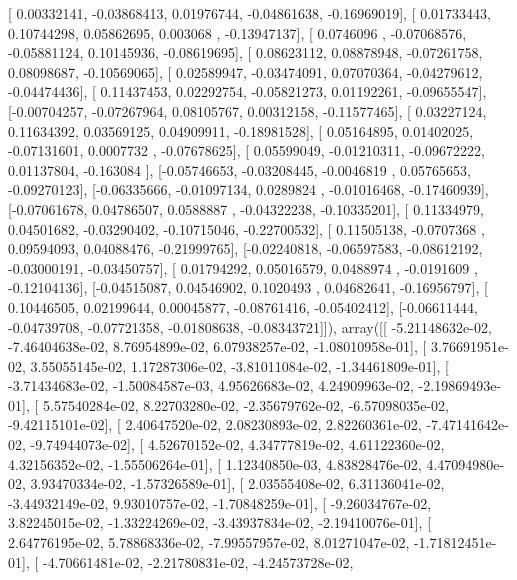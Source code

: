 \documentclass{article}
\begin{document}
       [ 0.00332141, -0.03868413,  0.01976744, -0.04861638, -0.16969019],
       [ 0.01733443,  0.10744298,  0.05862695,  0.003068  , -0.13947137],
       [ 0.0746096 , -0.07068576, -0.05881124,  0.10145936, -0.08619695],
       [ 0.08623112,  0.08878948, -0.07261758,  0.08098687, -0.10569065],
       [ 0.02589947, -0.03474091,  0.07070364, -0.04279612, -0.04474436],
       [ 0.11437453,  0.02292754, -0.05821273,  0.01192261, -0.09655547],
       [-0.00704257, -0.07267964,  0.08105767,  0.00312158, -0.11577465],
       [ 0.03227124,  0.11634392,  0.03569125,  0.04909911, -0.18981528],
       [ 0.05164895,  0.01402025, -0.07131601,  0.0007732 , -0.07678625],
       [ 0.05599049, -0.01210311, -0.09672222,  0.01137804, -0.163084  ],
       [-0.05746653, -0.03208445, -0.0046819 ,  0.05765653, -0.09270123],
       [-0.06335666, -0.01097134,  0.0289824 , -0.01016468, -0.17460939],
       [-0.07061678,  0.04786507,  0.0588887 , -0.04322238, -0.10335201],
       [ 0.11334979,  0.04501682, -0.03290402, -0.10715046, -0.22700532],
       [ 0.11505138, -0.0707368 ,  0.09594093,  0.04088476, -0.21999765],
       [-0.02240818, -0.06597583, -0.08612192, -0.03000191, -0.03450757],
       [ 0.01794292,  0.05016579,  0.0488974 , -0.0191609 , -0.12104136],
       [-0.04515087,  0.04546902,  0.1020493 ,  0.04682641, -0.16956797],
       [ 0.10446505,  0.02199644,  0.00045877, -0.08761416, -0.05402412],
       [-0.06611444, -0.04739708, -0.07721358, -0.01808638, -0.08343721]]), array([[ -5.21148632e-02,  -7.46404638e-02,   8.76954899e-02,
          6.07938257e-02,  -1.08010958e-01],
       [  3.76691951e-02,   3.55055145e-02,   1.17287306e-02,
         -3.81011084e-02,  -1.34461809e-01],
       [ -3.71434683e-02,  -1.50084587e-03,   4.95626683e-02,
          4.24909963e-02,  -2.19869493e-01],
       [  5.57540284e-02,   8.22703280e-02,  -2.35679762e-02,
         -6.57098035e-02,  -9.42115101e-02],
       [  2.40647520e-02,   2.08230893e-02,   2.82260361e-02,
         -7.47141642e-02,  -9.74944073e-02],
       [  4.52670152e-02,   4.34777819e-02,   4.61122360e-02,
          4.32156352e-02,  -1.55506264e-01],
       [  1.12340850e-03,   4.83828476e-02,   4.47094980e-02,
          3.93470334e-02,  -1.57326589e-01],
       [  2.03555408e-02,   6.31136041e-02,  -3.44932149e-02,
          9.93010757e-02,  -1.70848259e-01],
       [ -9.26034767e-02,   3.82245015e-02,  -1.33224269e-02,
         -3.43937834e-02,  -2.19410076e-01],
       [  2.64776195e-02,   5.78868336e-02,  -7.99557957e-02,
          8.01271047e-02,  -1.71812451e-01],
       [ -4.70661481e-02,  -2.21780831e-02,  -4.24573728e-02,
\end{document}
